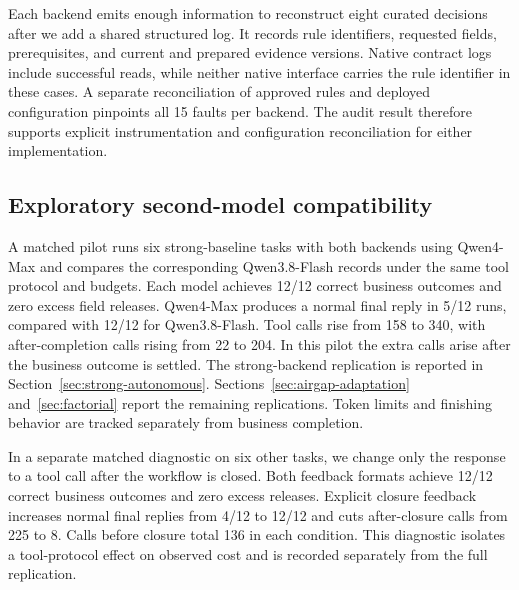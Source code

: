 Each backend emits enough information to reconstruct eight curated decisions after we add a shared structured log. It records rule identifiers, requested fields, prerequisites, and current and prepared evidence versions. Native contract logs include successful reads, while neither native interface carries the rule identifier in these cases. A separate reconciliation of approved rules and deployed configuration pinpoints all 15 faults per backend. The audit result therefore supports explicit instrumentation and configuration reconciliation for either implementation.

\subsection{Exploratory second-model compatibility}
A matched pilot runs six strong-baseline tasks with both backends using Qwen4-Max and compares the corresponding Qwen3.8-Flash records under the same tool protocol and budgets. Each model achieves 12/12 correct business outcomes and zero excess field releases. Qwen4-Max produces a normal final reply in 5/12 runs, compared with 12/12 for Qwen3.8-Flash. Tool calls rise from 158 to 340, with after-completion calls rising from 22 to 204. In this pilot the extra calls arise after the business outcome is settled. The strong-backend replication is reported in Section~\ref{sec:strong-autonomous}. Sections~\ref{sec:airgap-adaptation} and~\ref{sec:factorial} report the remaining replications. Token limits and finishing behavior are tracked separately from business completion.

In a separate matched diagnostic on six other tasks, we change only the response to a tool call after the workflow is closed. Both feedback formats achieve 12/12 correct business outcomes and zero excess releases. Explicit closure feedback increases normal final replies from 4/12 to 12/12 and cuts after-closure calls from 225 to 8. Calls before closure total 136 in each condition. This diagnostic isolates a tool-protocol effect on observed cost and is recorded separately from the full replication.
